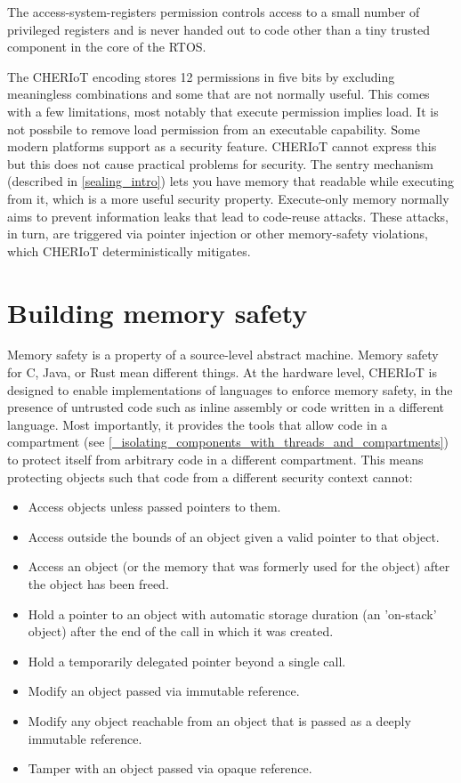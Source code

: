 The access-system-registers permission controls access to a small number of privileged registers and is never handed out to code other than a tiny trusted component in the core of the RTOS.

\begin{caution}
	The CHERIoT encoding stores 12 permissions in five bits by excluding meaningless combinations and some that are not normally useful.
	This comes with a few limitations, most notably that execute permission implies load.
	It is not possbile to remove load permission from an executable capability.
	Some modern platforms support  as a security feature.
	CHERIoT cannot express this but this does not cause practical problems for security.
	The sentry mechanism (described in \ref{sealing_intro}) lets you have memory that readable  while executing from it, which is a more useful security property.
	Execute-only memory normally aims to prevent information leaks that lead to code-reuse attacks.
	These attacks, in turn, are triggered via pointer injection or other memory-safety violations, which CHERIoT deterministically mitigates.
\end{caution}


\section{Building memory safety}

Memory safety is a property of a source-level abstract machine.
Memory safety for C, Java, or Rust mean different things.
At the hardware level, CHERIoT is designed to enable implementations of languages to enforce memory safety, in the presence of untrusted code such as inline assembly or code written in a different language.
Most importantly, it provides the tools that allow code in a compartment (see \ref{_isolating_components_with_threads_and_compartments}) to protect itself from arbitrary code in a different compartment.
This means protecting objects such that code from a different security context cannot:

\begin{itemize}
	\item{Access objects unless passed pointers to them.}
	\item{Access outside the bounds of an object given a valid pointer to that object.}
	\item{Access an object (or the memory that was formerly used for the object) after the object has been freed.}
	\item{Hold a pointer to an object with automatic storage duration (an 'on-stack' object) after the end of the call in which it was created.}
	\item{Hold a temporarily delegated pointer beyond a single call.}
	\item{Modify an object passed via immutable reference.}
	\item{Modify any object reachable from an object that is passed as a deeply immutable reference.}
	\item{Tamper with an object passed via opaque reference.}
\end{itemize}

